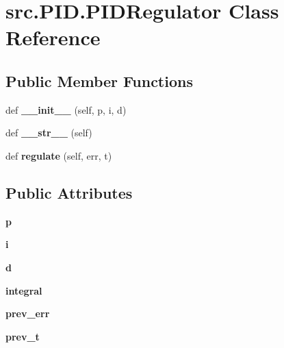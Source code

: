 \hypertarget{classsrc_1_1PID_1_1PIDRegulator}{}\section{src.\+P\+I\+D.\+P\+I\+D\+Regulator Class Reference}
\label{classsrc_1_1PID_1_1PIDRegulator}
\subsection*{Public Member Functions}
\begin{DoxyCompactItemize}
\item 
\mbox{\label{classsrc_1_1PID_1_1PIDRegulator_aa3a07c0c1f7b3ad9ea882038b0280cf8}} 
def {\bfseries \+\_\+\+\_\+init\+\_\+\+\_\+} (self, p, i, d)
\item 
\mbox{\label{classsrc_1_1PID_1_1PIDRegulator_a859a40a9ef80ca22399aa131a86f2a8a}} 
def {\bfseries \+\_\+\+\_\+str\+\_\+\+\_\+} (self)
\item 
\mbox{\label{classsrc_1_1PID_1_1PIDRegulator_a9b5b070215bacd578c293a703eb33394}} 
def {\bfseries regulate} (self, err, t)
\end{DoxyCompactItemize}
\subsection*{Public Attributes}
\begin{DoxyCompactItemize}
\item 
\mbox{\label{classsrc_1_1PID_1_1PIDRegulator_abfcbc7f203ebccc6559ba4527e9d163f}} 
{\bfseries p}
\item 
\mbox{\label{classsrc_1_1PID_1_1PIDRegulator_a12e9eb216813739d750cef68cb70aaf1}} 
{\bfseries i}
\item 
\mbox{\label{classsrc_1_1PID_1_1PIDRegulator_ae3619f64646cbc799849318c50b21662}} 
{\bfseries d}
\item 
\mbox{\label{classsrc_1_1PID_1_1PIDRegulator_aa2c205cebdef375413a7a6f3b245baaa}} 
{\bfseries integral}
\item 
\mbox{\label{classsrc_1_1PID_1_1PIDRegulator_adf6eb280b8497651c5b5cef278f54fa2}} 
{\bfseries prev\+\_\+err}
\item 
\mbox{\label{classsrc_1_1PID_1_1PIDRegulator_aabb9bb2f32bbb64b2b27b1c2b4d6982b}} 
{\bfseries prev\+\_\+t}
\end{DoxyCompactItemize}


